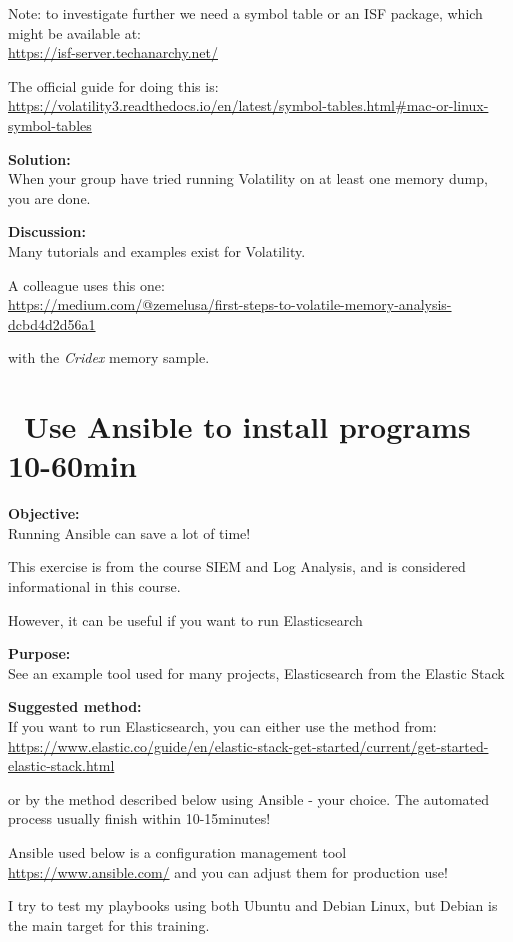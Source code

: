 \documentclass[a4paper,11pt,notitlepage]{report}
\begin{document}
Note: to investigate further we need a symbol table or an ISF package, which might be available at:\\
\url{https://isf-server.techanarchy.net/}

The official guide for doing this is:
\url{https://volatility3.readthedocs.io/en/latest/symbol-tables.html#mac-or-linux-symbol-tables}

{\bf Solution:}\\
When your group have tried running Volatility on at least one memory dump, you are done.

{\bf Discussion:}\\
Many tutorials and examples exist for Volatility.

A colleague uses this one:\\
\url{https://medium.com/@zemelusa/first-steps-to-volatile-memory-analysis-dcbd4d2d56a1}

with the \emph{Cridex} memory sample.



\chapter{\faInfoCircle\ Use Ansible to install programs 10-60min}
\label{ex:basicansible}


{\bf Objective:}\\
Running Ansible can save a lot of time!

This exercise is from the course SIEM and Log Analysis, and is considered informational in this course.

However, it can be useful if you want to run Elasticsearch

{\bf Purpose:}\\
See an example tool used for many projects, Elasticsearch from the Elastic Stack

{\bf Suggested method:}\\
If you want to run Elasticsearch, you can either use the method from:\\{\footnotesize
\url{https://www.elastic.co/guide/en/elastic-stack-get-started/current/get-started-elastic-stack.html}}

or by the method described below using Ansible - your choice. The automated process usually finish within 10-15minutes!

Ansible used below is a configuration management tool \url{https://www.ansible.com/} and you can adjust them for production use!

I try to test my playbooks using both Ubuntu and Debian Linux, but Debian is the main target for this training.
\end{document}
